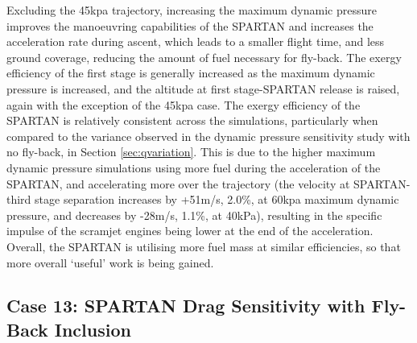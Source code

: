 Excluding the 45kpa trajectory, increasing the maximum dynamic pressure improves the manoeuvring capabilities of the SPARTAN and increases the acceleration rate during ascent, which leads to a smaller flight time, and less ground coverage, reducing the amount of fuel necessary for fly-back. 
The exergy efficiency of the first stage is generally increased as the maximum dynamic pressure is increased, and the altitude at first stage-SPARTAN release is raised, again with the exception of the 45kpa case. 
The exergy efficiency of the SPARTAN is relatively consistent across the simulations, particularly when compared to the variance observed in the dynamic pressure sensitivity study with no fly-back, in Section \ref{sec:qvariation}.
This is due to the higher maximum dynamic pressure simulations using more fuel during the acceleration of the SPARTAN, and accelerating more over the trajectory (the velocity at SPARTAN-third stage separation increases by +51m/s, 2.0\%, at 60kpa maximum dynamic pressure, and decreases by -28m/s, 1.1\%, at 40kPa), resulting in the specific impulse of the scramjet engines being lower at the end of the acceleration. Overall, the SPARTAN is utilising more fuel mass at similar efficiencies, so that more overall `useful' work is being gained. 


\subsection{Case 13: SPARTAN Drag Sensitivity with Fly-Back Inclusion}


